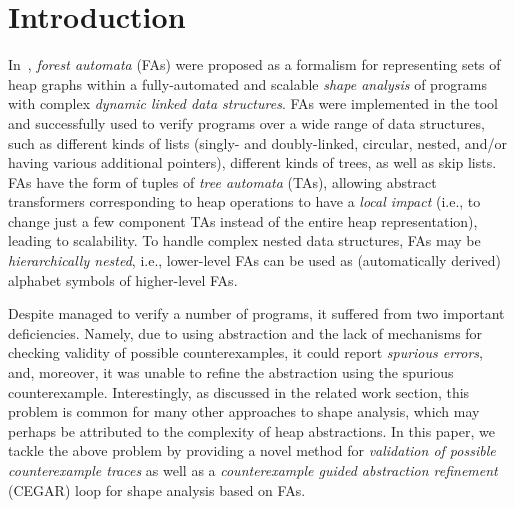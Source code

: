 {\section{Introduction}\label{sec:label}

In~\cite{forester12,boxes13}, \emph{forest automata} (FAs) were proposed as a
formalism for representing sets of heap graphs within a fully-automated and
scalable \emph{shape analysis} of programs with complex \emph{dynamic linked
data structures}. FAs were implemented in the \forester{} tool and successfully
used to verify programs over a wide range of data structures, such as different
kinds of lists (singly- and doubly-linked, circular, nested, and/or having
various additional pointers), different kinds of trees, as well as skip lists.
FAs have the form of tuples of \emph{tree automata} (TAs), allowing abstract
transformers corresponding to heap operations to have a \emph{local impact}
(i.e., to change just a few component TAs instead of the entire heap
representation), leading to scalability. To handle complex nested data
structures, FAs may be \emph{hierarchically nested}, i.e., lower-level FAs can
be used as (automatically derived) alphabet symbols of higher-level FAs.

Despite \forester{} managed to verify a number of programs, it suffered from two
important deficiencies.
Namely, due to using abstraction and the lack of
mechanisms for checking validity of possible counterexamples, it could report
\emph{spurious errors}, and, moreover, it was unable to refine the abstraction
using the spurious counterexample.
Interestingly, as discussed in the related
work section, this problem is common for many other approaches to shape
analysis, which may perhaps be attributed to the complexity of heap
abstractions. In this paper, we tackle the above problem by providing a novel
method for \emph{validation of possible counterexample traces} as well as a
\emph{counterexample guided abstraction refinement} (CEGAR) loop for shape
analysis based on FAs.


}
